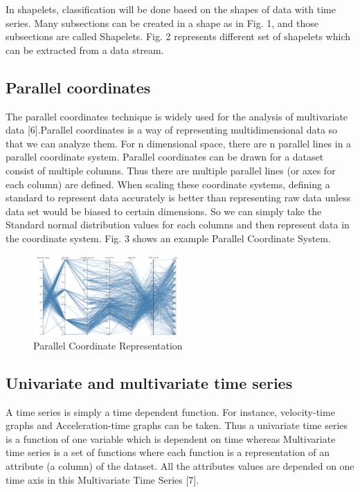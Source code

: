 \documentclass[letterpaper, 10 pt, conference]{IEEEtran}  %
\begin{document}
In shapelets, classification will be done based on the shapes of data with time series. Many subsections can be created in a shape as in Fig. 1, and those subsections are called Shapelets. Fig. 2 represents different set of shapelets which can be extracted from a data stream.

\subsection{Parallel coordinates}

The parallel coordinates technique is widely used for the analysis of multivariate data [6].Parallel coordinates is a way of representing multidimensional data so that we can analyze them. For n dimensional space,  there are n parallel lines in a parallel coordinate system. Parallel coordinates can be drawn for a dataset consist of multiple columns. Thus there are multiple parallel lines (or axes for each column) are defined. When scaling these coordinate systems, defining a standard to represent data accurately is better than representing raw data unless data set would be biased to certain dimensions. So we can simply take the Standard normal distribution values for each columns and then represent data in the coordinate system. Fig. 3 shows an example Parallel Coordinate System.
\begin{figure}[h!]
\includegraphics[width=0.5\textwidth]{parrelel.png}
\caption{Parallel Coordinate Representation}
\end{figure}

\subsection{Univariate and multivariate time series}

A time series is simply a time dependent function. For instance, velocity-time graphs and Acceleration-time graphs can be taken. Thus a univariate time series is a function of one variable which is dependent on time whereas Multivariate time series is a set of functions where each function is a representation of an attribute (a column) of the dataset. All the attributes values are depended on one time axis in this Multivariate Time Series [7].
 
\end{document}
